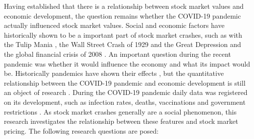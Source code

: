 Having established that there is a relationship between stock market values and economic development, the question remains whether the COVID-19 pandemic actually influenced stock market values. Social and economic factors have historically shown to be a important part of stock market crashes, such as with the Tulip Mania \cite{garber1989}, the Wall Street Crash of 1929 and the Great Depression \cite{white1990, kindleberger1986world} and the global financial crisis of 2008 \cite{crotty2009}. An important question during the recent pandemic was whether it would influence the economy and what its impact would be. Historically pandemics have shown their effects \cite{osterholm2017preparing, correia1918pandemics, jorda2020longer}, but the quantitative relationship between the COVID-19 pandemic and economic development is still an object of research \cite{chudik2020economic, baldwin2020economics, fernandes2020economic, deb2020economic}. During the COVID-19 pandemic daily data was registered on its development, such as infection rates, deaths, vaccinations and government restrictions \cite{dong2020interactive, hale2020variation}. As stock market crashes generally are a social phenomenon, this research investigates the relationship between these features and stock market pricing. The following research questions are posed:



